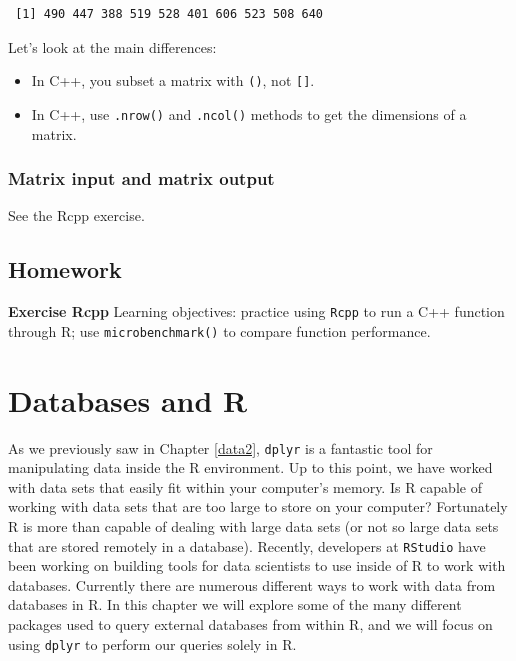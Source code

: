 \documentclass[]{krantz}
\providecommand{\tightlist}{%
  \setlength{\itemsep}{0pt}\setlength{\parskip}{0pt}}
\begin{document}
\begin{verbatim}
 [1] 490 447 388 519 528 401 606 523 508 640
\end{verbatim}

Let's look at the main differences:

\begin{itemize}
\tightlist
\item
  In C++, you subset a matrix with \texttt{()}, not \texttt{{[}{]}}.
\item
  In C++, use \texttt{.nrow()} and \texttt{.ncol()} methods to get the dimensions of a matrix.
\end{itemize}

\hypertarget{matrix-input-and-matrix-output}{%
\subsection{Matrix input and matrix output}\label{matrix-input-and-matrix-output}}

See the Rcpp exercise.

\hypertarget{homework-8}{%
\section{Homework}\label{homework-8}}

\textbf{Exercise Rcpp} Learning objectives: practice using \texttt{Rcpp} to run a C++ function through R; use \texttt{microbenchmark()} to compare function performance.

\hypertarget{databases-and-r}{%
\chapter{Databases and R}\label{databases-and-r}}

As we previously saw in Chapter \ref{data2}, \texttt{dplyr} is a fantastic tool for manipulating data inside the R environment. Up to this point, we have worked with data sets that easily fit within your computer's memory. Is R capable of working with data sets that are too large to store on your computer? Fortunately R is more than capable of dealing with large data sets (or not so large data sets that are stored remotely in a database). Recently, developers at \texttt{RStudio} have been working on building tools for data scientists to use inside of R to work with databases. Currently there are numerous different ways to work with data from databases in R. In this chapter we will explore some of the many different packages used to query external databases from within R, and we will focus on using \texttt{dplyr} to perform our queries solely in R.
\end{document}
